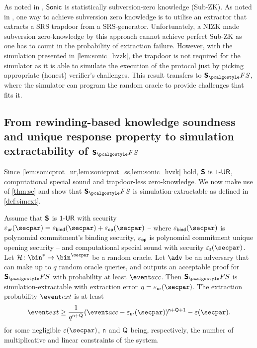 \begin{remark} 
  As noted in \cite{CCS:MBKM19}, ${\textnormal{\textsf{Sonic}}}$ is statistically subversion-zero
  knowledge (Sub-ZK). As noted in \cite{AC:ABLZ17}, one way to achieve
  subversion zero knowledge is to utilise an extractor that extracts a SRS
  trapdoor from a SRS-generator. Unfortunately, a NIZK made subversion
  zero-knowledge by this approach cannot achieve perfect Sub-ZK as one has to
  count in the probability of extraction failure. However, with the simulation
  presented in \cref{lem:sonic_hvzk}, the trapdoor is not required for the
  simulator as it is able to simulate the execution of the protocol just by
  picking appropriate (honest) verifier's challenges. This result transfers to
  $\sonicprotfs$, where the simulator can program the random oracle to provide
  challenges that fits it.
\end{remark}

\subsection{From rewinding-based knowledge soundness and unique response property to simulation extractability of $\sonicprotfs$}
Since \cref{lem:sonicprot_ur,lem:sonicprot_ss,lem:sonic_hvzk} hold, $\bm{\mathsf{S}}$ is ${1\text{-}\mathsf{UR}}$, computational special sound and trapdoor-less zero-knowledge. We now make use
of \cref{thm:se} and show that $\sonicprotfs$ is simulation-extractable as defined in \cref{def:simext}.

\begin{corollary}
  \label{thm:sonicprotfs_se}
  Assume that $\bm{\mathsf{S}}$ is ${1\text{-}\mathsf{UR}}$ with security
  $\epsur(\secpar) = \epsbind(\secpar) + \epsop(\secpar)$ -- where
  $\epsbind (\secpar)$ is polynomial commitment's binding security, $\varepsilon_{\mathsf{op}}$ is
  polynomial commitment unique opening security -- and computational special sound with
  security $\epss(\secpar)$. Let $\ro\colon \bin^* \to \bin^\secpar$ be a
  random oracle. Let $\advse$ be an adversary that can make up to $q$
  random oracle queries, and outputs an
  acceptable proof for $\sonicprotfs$ with probability at least $\accProb$. Then
  $\sonicprotfs$ is simulation-extractable with extraction error
  $\eta = \epsur(\secpar)$. The extraction probability $\extProb$ is at least
\[
		\extProb  \geq \frac{1}{q^{\multconstr + \linconstr}} (\accProb - \epsur(\secpar))^{\multconstr +
		\linconstr + 1} - \eps(\secpar).
	\]
	for some negligible $\eps(\secpar)$, $\mathsf{n}$ and $\mathsf{Q}$ being,
  respectively, the number of multiplicative and linear constraints of the system.
\end{corollary}


